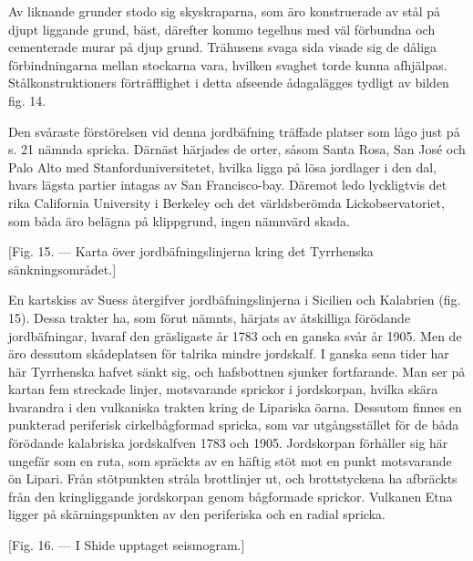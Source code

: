 \documentclass[a4paper, 12pt, oneside, swedish]{article}
\begin{document}
Av liknande grunder stodo sig skyskraparna, som äro konstruerade av stål på djupt liggande grund, bäst, därefter kommo tegelhus med väl förbundna och cementerade murar på djup grund. Trähusens svaga sida visade sig de dåliga förbindningarna mellan stockarna vara, hvilken svaghet torde kunna afhjälpas. Stålkonstruktioners förträfflighet i detta afseende ådagalägges tydligt av bilden fig. 14.

Den svåraste förstörelsen vid denna jordbäfning träffade platser som lågo just på s. 21 nämnda spricka. Därnäst härjades de orter, såsom Santa Rosa, San José och Palo Alto med Stanforduniversitetet, hvilka ligga på lösa jordlager i den dal, hvars lägsta partier intagas av San Francisco-bay. Däremot ledo lyckligtvis det rika California University i Berkeley och det världsberömda Lickobservatoriet, som båda äro belägna på klippgrund, ingen nämnvärd skada.

[Fig. 15. --- Karta över jordbäfningslinjerna kring det Tyrrhenska sänkningsområdet.]

En kartskiss av Suess återgifver jordbäfningslinjerna i Sicilien och Kalabrien (fig. 15). Dessa trakter ha, som förut nämnts, härjats av åtskilliga förödande jordbäfningar, hvaraf den gräsligaste år 1783 och en ganska svår år 1905. Men de äro dessutom skådeplatsen för talrika mindre jordskalf. I ganska sena tider har här Tyrrhenska hafvet sänkt sig, och hafsbottnen sjunker fortfarande. Man ser på kartan fem streckade linjer, motsvarande sprickor i jordskorpan, hvilka skära hvarandra i den vulkaniska trakten kring de Lipariska öarna. Dessutom finnes en punkterad periferisk cirkelbågformad spricka, som var utgångsstället för de båda förödande kalabriska jordskalfven 1783 och 1905. Jordskorpan förhåller sig här ungefär som en ruta, som spräckts av en häftig stöt mot en punkt motsvarande ön Lipari. Från stötpunkten stråla brottlinjer ut, och brottstyckena ha afbräckts från den kringliggande jordskorpan genom bågformade sprickor. Vulkanen Etna ligger på skärningspunkten av den periferiska och en radial spricka.

[Fig. 16. --- I Shide upptaget seismogram.]
\end{document}
